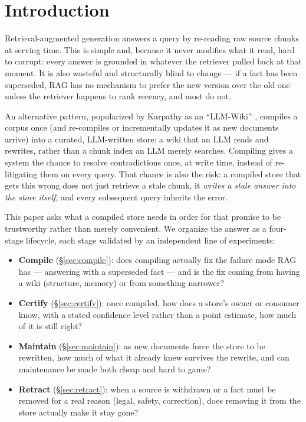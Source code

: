 \section{Introduction}
\label{sec:intro}

Retrieval-augmented generation answers a query by re-reading raw source chunks at serving time. This is simple and, because it never modifies what it read, hard to corrupt: every answer is grounded in whatever the retriever pulled back at that moment. It is also wasteful and structurally blind to change --- if a fact has been superseded, RAG has no mechanism to prefer the new version over the old one unless the retriever happens to rank recency, and most do not.

An alternative pattern, popularized by Karpathy as an ``LLM-Wiki'' \citep{karpathy2026wiki}, compiles a corpus once (and re-compiles or incrementally updates it as new documents arrive) into a curated, LLM-written store: a wiki that an LLM reads and rewrites, rather than a chunk index an LLM merely searches. Compiling gives a system the chance to resolve contradictions once, at write time, instead of re-litigating them on every query. That chance is also the risk: a compiled store that gets this wrong does not just retrieve a stale chunk, it \emph{writes a stale answer into the store itself}, and every subsequent query inherits the error.

This paper asks what a compiled store needs in order for that promise to be trustworthy rather than merely convenient. We organize the answer as a four-stage lifecycle, each stage validated by an independent line of experiments:

\begin{itemize}[leftmargin=1.4em,itemsep=0.2em]
\item \textbf{Compile} (\S\ref{sec:compile}): does compiling actually fix the failure mode RAG has --- answering with a superseded fact --- and is the fix coming from having a wiki (structure, memory) or from something narrower?
\item \textbf{Certify} (\S\ref{sec:certify}): once compiled, how does a store's owner or consumer know, with a stated confidence level rather than a point estimate, how much of it is still right?
\item \textbf{Maintain} (\S\ref{sec:maintain}): as new documents force the store to be rewritten, how much of what it already knew survives the rewrite, and can maintenance be made both cheap and hard to game?
\item \textbf{Retract} (\S\ref{sec:retract}): when a source is withdrawn or a fact must be removed for a real reason (legal, safety, correction), does removing it from the store actually make it stay gone?
\end{itemize}

